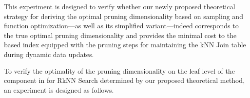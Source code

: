 
This experiment is designed to verify whether our newly proposed theoretical strategy for deriving the optimal pruning dimensionality based on sampling and function optimization—as well as its simplified variant—indeed corresponds to the true optimal pruning dimensionality and provides the minimal cost to the \dualtree based index equipped with the pruning steps for maintaining the kNN Join table during dynamic data updates.

To verify the optimality of the pruning dimensionality on the leaf level of the \hdrtree component in \dualtree for RkNN Search determined by our proposed theoretical method, an experiment is designed as follows.

